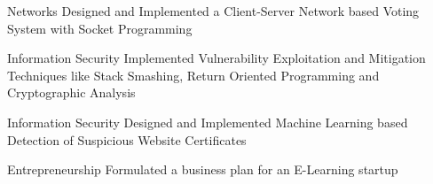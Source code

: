 \begin{cvprojects}
  \cvproject
    {Networks} %
    {Designed and Implemented a Client-Server Network based Voting System with Socket Programming} %

  \cvproject
    {Information Security} %
    {Implemented Vulnerability Exploitation and Mitigation Techniques like Stack Smashing, Return Oriented Programming and Cryptographic Analysis} %

  \cvproject
    {Information Security} %
    {Designed and Implemented Machine Learning based Detection of Suspicious Website Certificates} %

  \cvproject
    {Entrepreneurship} %
    {Formulated a business plan for an E-Learning startup} %

\end{cvprojects}
